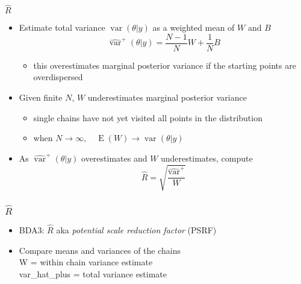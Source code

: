 \documentclass[finnish,english,t]{beamer}
\renewcommand{\emph}[1]{\textcolor{navyblue}{#1}}
\DeclareMathOperator{\E}{E}
\DeclareMathOperator{\var}{var}
\begin{document}
\begin{frame}{$\widehat{R}$}

  \begin{itemize}
  \item Estimate total variance
    $\var(\theta|y)$ as a weighted mean of $W$ and $B$
    \begin{equation*}
      \widehat{\var}^{+}(\theta|y) = \frac{N-1}{N}W+\frac{1}{N}B
    \end{equation*}
    \vspace{-0.5\baselineskip}
    \begin{itemize}
    \item this \emph{overestimates} marginal posterior variance if the
      starting points are overdispersed
    \end{itemize}
    \vspace{0.5\baselineskip}
  \item<2-> Given finite $N$, $W$ \emph{underestimates} marginal posterior variance
    \begin{itemize}
    \item single chains have not yet visited all points in the distribution
    \item when $N\rightarrow\infty, \quad \E(W)\rightarrow \var(\theta|y)$
    \end{itemize}
    \vspace{0.5\baselineskip}
  \item<3-> As $\widehat{\var}^{+}(\theta|y)$ overestimates and $W$ underestimates,
    compute
    \begin{equation*}
      \widehat{R}=\sqrt{\frac{\widehat{\var}^{+}}{W}}
    \end{equation*}
\end{itemize}  

\end{frame}

\begin{frame}[fragile]
  \frametitle{$\widehat{R}$}

  \begin{itemize}
  \item BDA3: $\widehat{R}$ aka {\em potential scale reduction factor} (PSRF)
  \item Compare means and variances of the chains\\
    W = within chain variance estimate\\
    var\_hat\_plus = total variance estimate\\
    \vspace{1\baselineskip}
  \end{itemize}  

\end{frame}
\end{document}
